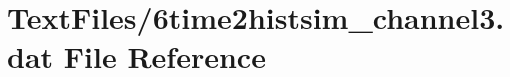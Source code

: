 \hypertarget{6time2histsim__channel3_8dat}{}\section{Text\+Files/6time2histsim\+\_\+channel3.dat File Reference}
\label{6time2histsim__channel3_8dat}
